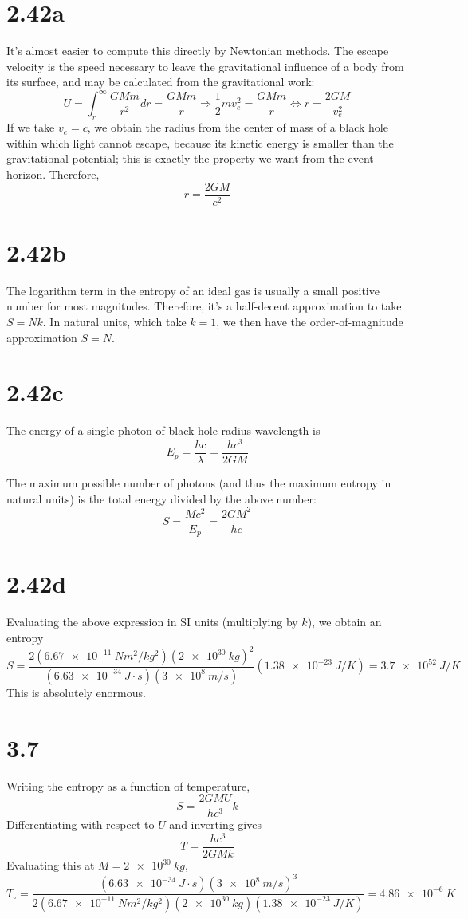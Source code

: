 \documentclass{article}
\begin{document}
\section*{2.42a}
It's almost easier to compute this directly by Newtonian methods. The escape velocity is the speed necessary to leave the gravitational influence of a body from its surface, and may be calculated from the gravitational work:
\[U=\int_{r}^{\infty}\frac{GMm}{r^{2}}dr=\frac{GMm}{r}\Rightarrow \frac{1}{2}mv_{e}^{2}=\frac{GMm}{r}\Leftrightarrow r=\frac{2GM}{v_{e}^{2}}\]
If we take $v_{e}=c$, we obtain the radius from the center of mass of a black hole within which light cannot escape, because its kinetic energy is smaller than the gravitational potential; this is exactly the property we want from the event horizon. Therefore,
\[r=\frac{2GM}{c^{2}}\]

\section*{2.42b}
The logarithm term in the entropy of an ideal gas is usually a small positive number for most magnitudes. Therefore, it's a half-decent approximation to take $S=Nk$. In natural units, which take $k=1$, we then have the order-of-magnitude approximation $S=N$.

\section*{2.42c}
The energy of a single photon of black-hole-radius wavelength is
\[E_{p}=\frac{hc}{\lambda}=\frac{hc^{3}}{2GM}\]

The maximum possible number of photons (and thus the maximum entropy in natural units) is the total energy divided by the above number:
\[S=\frac{Mc^{2}}{E_{p}}=\frac{2GM^{2}}{hc}\]

\section*{2.42d}
Evaluating the above expression in SI units (multiplying by $k$), we obtain an entropy
\[S=\frac{2(\SI{6.67e-11}{N m^{2}/kg^{2}})(\SI{2e30}{kg})^{2}}{(\SI{6.63e-34}{J\cdot s})(\SI{3e8}{m/s})}(\SI{1.38e-23}{J/K})=\SI{3.7e52}{J/K}\]
This is absolutely enormous.

\section*{3.7}
Writing the entropy as a function of temperature,
\[S=\frac{2GMU}{hc^{3}}k\]
Differentiating with respect to $U$ and inverting gives
\[T=\frac{h c^{3}}{2GMk}\]
Evaluating this at $M=\SI{2e30}{kg}$,
\[T_{\circ}=\frac{(\SI{6.63e-34}{J\cdot s})(\SI{3e8}{m/s})^{3}}{2(\SI{6.67e-11}{Nm^{2}/kg^{2}})(\SI{2e30}{kg})(\SI{1.38e-23}{J/K})}=\SI{4.86e-6}{K}\]
\end{document}
